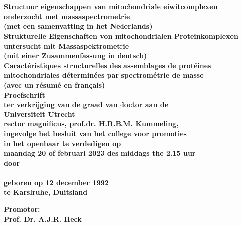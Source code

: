 \begin{titlepage}
    \begin{center}
        {\huge \bfseries \thesistitle \par \ }\\
        [0.5cm]
        {\small \bfseries Structuur eigenschappen van mitochondriale eiwitcomplexen onderzocht met massaspectrometrie\\
        (met een samenvatting in het Nederlands)}\\
        [0.25cm]
        {\small \bfseries Strukturelle Eigenschaften von mitochondrialen Proteinkomplexen untersucht mit Massaspektrometrie\\
        (mit einer Zusammenfassung in deutsch)}\\
        [0.25cm]
        {\small \bfseries Caractéristiques structurelles des assemblages de protéines mitochondriales déterminées par spectrométrie de masse\\
        (avec un résumé en français)}\\
        [2cm]
        {\Large \bfseries Proefschrift}\\
        \bigskip
        \bigskip
        {\small \bfseries ter verkrijging van de graad van doctor aan de\\
            Universiteit Utrecht\\
            rector magnificus, prof.dr. H.R.B.M. Kummeling,\\
            ingevolge het besluit van het college voor promoties\\
            in het openbaar te verdedigen op\\
            \bigskip
            maandag 20 of februari 2023 des middags the 2.15 uur}\\
        [1cm]
        {\small \bfseries door}\\
        [1cm]

        {\large \bfseries\name\\
        \smallskip
        \small geboren op 12 december 1992\\
        te Karslruhe, Duitsland}

    \end{center}

    \clearpage

    \begin{flushleft}
        {\bfseries Promotor:\\
            \small Prof. Dr. A.J.R. Heck}
    \end{flushleft}

\end{titlepage}